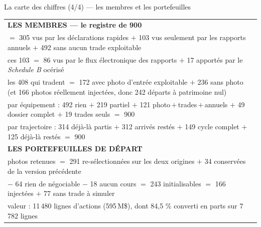 \documentclass[11pt,aspectratio=169]{beamer}
\newcommand{\defl}[1]{{\scriptsize\color{black!55}#1}}
\begin{document}
\begin{frame}{La carte des chiffres (4/4) --- les membres et les portefeuilles}
  \centering
  {\footnotesize
  \begin{tabular}{@{}p{}@{}}
  \toprule
  \textbf{LES MEMBRES --- le registre de 900}\\
  \quad 900 $=$ 305 vus par les déclarations rapides $+$ 103 vus seulement par les rapports annuels
        $+$ 492 sans aucun trade exploitable\\
  \quad ces 103 $=$ 86 vus par le flux électronique des rapports $+$ 17 apportés par le
        \emph{Schedule B} océrisé\\
  \quad les 408 qui tradent $=$ 172 avec photo d'entrée exploitable $+$ 236 sans photo
        \defl{(et 166 photos réellement injectées, donc 242 départs à patrimoine nul)}\\
  \quad par équipement : 492 rien $+$ 219 partiel $+$ 121 photo\,$+$\,trades\,$+$\,annuels
        $+$ 49 dossier complet $+$ 19 trades seuls $=$ 900\\
  \quad par trajectoire : 314 déjà-là partis $+$ 312 arrivés restés $+$ 149 cycle complet
        $+$ 125 déjà-là restés $=$ 900\\
  \midrule
  \textbf{LES PORTEFEUILLES DE DÉPART}\\
  \quad 325 photos retenues $=$ 291 re-sélectionnées sur les deux origines $+$ 34 conservées de la version précédente\\
  \quad 325 $-$ 64 rien de négociable $-$ 18 aucun cours $=$ 243 initialisables
        $=$ 166 injectées $+$ 77 sans trade à simuler\\
  \quad valeur : 11\,480 lignes d'actions (595\,M\$), dont 84,5 \% converti en parts sur 7\,782 lignes\\
  \bottomrule
  \end{tabular}}
\end{frame}
\end{document}
